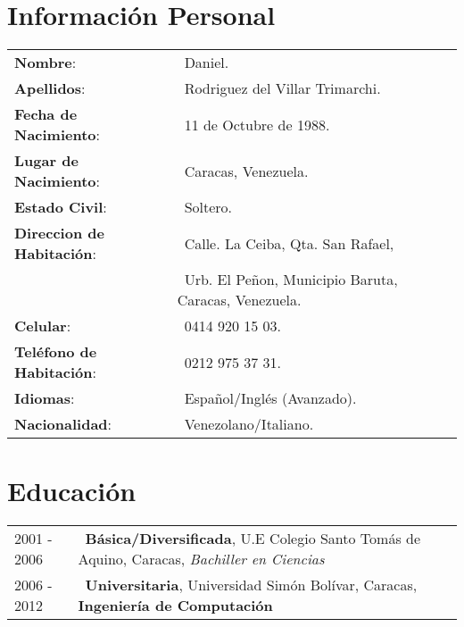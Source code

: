 \documentclass[10pt,a4paper]{moderncv}
\begin{document}
\maketitle

\section{Informaci\'on Personal}
	\begin{tabular}{l  l}
		\textbf{Nombre}:    		    	        & \ Daniel. \\
		\textbf{Apellidos}: 		      	      & \ Rodriguez del Villar 
                                              Trimarchi. \\
		\textbf{Fecha de Nacimiento}:         & \ 11 de Octubre de 1988. \\
		\textbf{Lugar de Nacimiento}:         & \ Caracas, Venezuela. \\
		\textbf{Estado Civil}: 		      	    & \ Soltero. \\
		\textbf{Direccion de Habitaci\'on}:   & \ Calle. La Ceiba, Qta. San 
                                              Rafael, \\
                                          & \ Urb. El Peñon, Municipio Baruta, 
                                              Caracas, Venezuela. \\
		\textbf{Celular}: 				  	        & \ 0414 920 15 03. \\
		\textbf{Tel\'efono de Habitaci\'on}:  & \ 0212 975 37 31. \\
		\textbf{Idiomas}:                 	  & \ Español/Ingl\'es (Avanzado). \\
		\textbf{Nacionalidad}:                & \ Venezolano/Italiano. \\
	\end{tabular}

\section{Educaci\'on}
	\begin{tabular}{l l}
		2001 - 2006   & \ \textbf{B\'asica/Diversificada}, U.E Colegio Santo 
                       Tom\'as de Aquino, Caracas, \textit{Bachiller en 
                       Ciencias} \\  
		2006 - 2012   & \ \textbf{Universitaria}, Universidad Sim\'on Bol\'ivar, 
                       Caracas, \textbf{Ingenier\'ia de Computaci\'on}\\
	\end{tabular}
	
\end{document}
